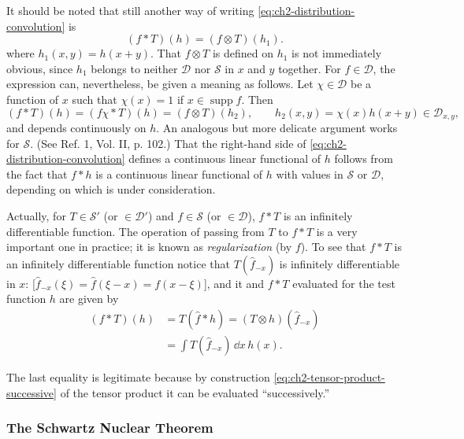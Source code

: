 It should be noted that still another way of writing \eqref{eq:ch2-distribution-convolution} is
\begin{equation*}
  (f*T)(h)=(f\otimes T)(h_1).
\end{equation*}
where $h_1(x,y)=h(x+y)$. That $f\otimes T$ is defined on $h_1$ is not
immediately obvious, since $h_1$ belongs to neither $\mathcal{D}$ nor
$\mathcal{S}$ in $x$ and $y$ together. For $f\in\mathcal{D}$, the expression
can, nevertheless, be given a meaning as follows. Let $\chi\in\mathcal{D}$ be
a function of $x$ such that $\chi(x)=1$ if $x\in\operatorname{supp}f$. Then
\begin{equation*}
  (f*T)(h)=(f\chi*T)(h)=(f\otimes T)(h_2),
  \qquad h_2(x,y)=\chi(x)h(x+y)\in\mathcal{D}_{x,y},
\end{equation*}
and depends continuously on $h$. An analogous but more delicate argument
works for $\mathcal{S}$. (See Ref. 1, Vol. II, p. 102.) That the right-hand
side of \eqref{eq:ch2-distribution-convolution} defines a continuous linear functional of $h$ follows from the
fact that $f*h$ is a continuous linear functional of $h$ with values in
$\mathcal{S}$ or $\mathcal{D}$, depending on which is under consideration.

Actually, for $T\in\mathcal{S}'$ (or $\in\mathcal{D}'$) and $f\in\mathcal{S}$
(or $\in\mathcal{D}$), $f*T$ is an infinitely differentiable function. The
operation of passing from $T$ to $f*T$ is a very important one in practice;
it is known as \emph{regularization} (by $f$). To see that $f*T$ is an
infinitely differentiable function notice that $T(\widehat{f}_{-x})$ is
infinitely differentiable in $x$: [$\widehat{f}_{-x}(\xi)=\widehat{f}(\xi-x)
=f(x-\xi)$], and it and $f*T$ evaluated for the test function $h$ are given
by
\begin{equation*}
\begin{aligned}
  (f*T)(h)&=T(\widehat{f}*h)=(T\otimes h)(\widehat{f}_{-x})\\
    &=\int T(\widehat{f}_{-x})\,\dd x\,h(x).
\end{aligned}
\end{equation*}

The last equality is legitimate because by construction \eqref{eq:ch2-tensor-product-successive} of the tensor
product it can be evaluated ``successively.''

\subsubsection*{The Schwartz Nuclear Theorem}

